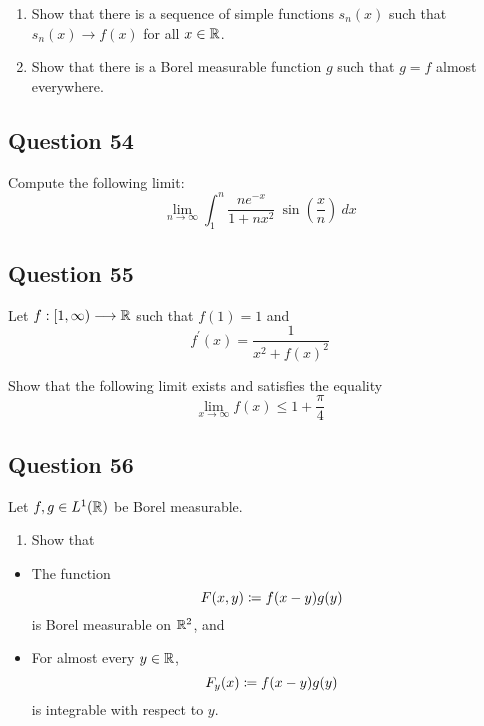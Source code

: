 \documentclass[12pt]{article}
\providecommand{\tightlist}{%
  \setlength{\itemsep}{0pt}\setlength{\parskip}{0pt}}
\begin{document}
\begin{enumerate}
\def\labelenumi{\arabic{enumi}.}
\tightlist
\item
  Show that there is a sequence of simple functions \(s_n(x)\) such that
  \(s_n(x) \to f(x)\) for all \(x\in {\mathbb{R}}\).
\item
  Show that there is a Borel measurable function \(g\) such that
  \(g = f\) almost everywhere.
\end{enumerate}

\hypertarget{question-54-1}{%
\subsection{Question 54}\label{question-54-1}}

Compute the following limit: \[
\lim _{n \rightarrow \infty} \int_{1}^{n} \frac{n e^{-x}}{1+n x^{2}} ~\sin \left(\frac x n\right) ~d x
\]

\hypertarget{question-55-1}{%
\subsection{Question 55}\label{question-55-1}}

Let \(f: [1, \infty) \longrightarrow {\mathbb{R}}\) such that \(f(1) = 1\) and \[
f^{\prime}(x)= \frac{1} {x^{2}+f(x)^{2}}
\]

Show that the following limit exists and satisfies the equality \[
\lim _{x \rightarrow \infty} f(x) \leq 1 + \frac \pi 4
\]

\hypertarget{question-56-1}{%
\subsection{Question 56}\label{question-56-1}}

Let \(f, g \in L^1({\mathbb{R}})\) be Borel measurable.

\begin{enumerate}
\def\labelenumi{\arabic{enumi}.}
\tightlist
\item
  Show that
\end{enumerate}

\begin{itemize}
\tightlist
\item
  The function \[F(x, y) \coloneqq f(x-y) g(y)\] is Borel measurable on
  \({\mathbb{R}}^2\), and
\item
  For almost every \(y\in {\mathbb{R}}\), \[F_y(x) \coloneqq f(x-y)g(y)\] is
  integrable with respect to \(y\).
\end{itemize}
\end{document}
